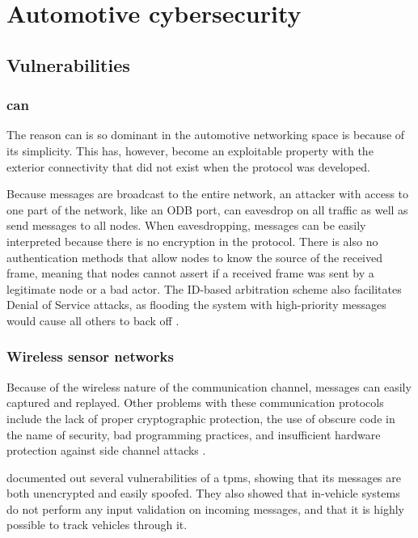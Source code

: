 \section{Automotive cybersecurity}

\subsection{Vulnerabilities}

\subsubsection{\gls{can}}

The reason \gls{can} is so dominant in the automotive networking space is because of its simplicity. This has, however, become an exploitable property with the exterior connectivity that did not exist when the protocol was developed.\par

Because messages are broadcast to the entire network, an attacker with access to one part of the network, like an ODB port, can eavesdrop on all traffic as well as send messages to all nodes. When eavesdropping, messages can be easily interpreted because there is no encryption in the protocol. There is also no authentication methods that allow nodes to know the source of the received frame, meaning that nodes cannot assert if a received frame was sent by a legitimate node or a bad actor. The ID-based arbitration scheme also facilitates Denial of Service attacks, as flooding the system with high-priority messages would cause all others to back off \citep{scalas2019automotive}.

\subsubsection{Wireless sensor networks}

Because of the wireless nature of the communication channel, messages can easily captured and replayed. Other problems with these communication protocols include the lack of proper cryptographic protection, the use of obscure code in the name of security, bad programming practices, and insufficient hardware protection against side channel attacks \citep{Le2018}.\par

\cite{rouf2010security} documented out several vulnerabilities of a \gls{tpms}, showing that its messages are both unencrypted and easily spoofed. They also showed that in-vehicle systems do not perform any input validation on incoming messages, and that it is highly possible to track vehicles through it.

